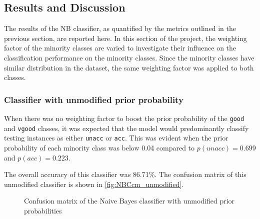 \documentclass[a4paper]{article}
\begin{document}
\subsection{Results and Discussion}
The results of the NB classifier, as quantified by the metrics outlined in the previous section, are reported here. In this section of the project, the weighting factor of the minority classes are varied to investigate their influence on the classification performance on the minority classes. Since the minority classes have similar distribution in the dataset, the same weighting factor was applied to both classes.

\subsubsection{Classifier with unmodified prior probability}
When there was no weighting factor to boost the prior probability of the \lstinline{good} and \lstinline{vgood} classes, it was expected that the model would predominantly classify testing instances as either \lstinline{unacc} or \lstinline{acc}. This was evident when the prior probability of each minority class was below 0.04 compared to $p(unacc)=0.699$ and $p(acc)=0.223$. 

The overall accuracy of this classifier was 86.71\%. The confusion matrix of this unmodified classifier is shown in \autoref{fig:NBCcm_unmodified}. 

\begin{figure} [h!]
  \caption{Confusion matrix of the Naive Bayes classifier with unmodified prior probabilities} 
  \label{fig:NBCcm_unmodified}
\end{figure}
\end{document}
